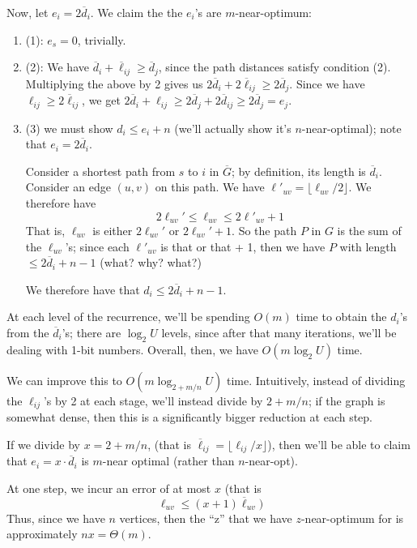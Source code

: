 \documentclass{article}
\begin{document}
Now, let $e_i = 2\overline d_i$.
We claim the the $e_i$'s are $m$-near-optimum:
\begin{enumerate}
	\item
	(1): $e_s= 0$, trivially.
	\item
	(2): We have $\overline d_i + \overline \ell_{ij} \geq \overline d_j$,
	since the path distances satisfy condition (2).
	Multiplying the above by 2 gives us
	$2 \overline d_i + 2 \overline \ell_{ij} \geq 2 \overline d_j$.
	Since we have $\ell_{ij} \geq 2 \overline \ell_{ij}$,
	we get
	$2 \overline d_i +  \ell_{ij} \geq 2 \overline d_j + 2 \overline d_{ij}
	\geq 2 \overline d_j = e_j$.
	
	\item
	(3) we must show $d_i \leq e_i + n$ (we'll actually show it's 
	$n$-near-optimal); note that $e_i = 2\overline d_i$.

	Consider a shortest path from $s$ to $i$ in $\overline G$; by definition,
	its length is $\overline d_i$.
	Consider an edge $(u,v)$ on this path. We have
	$\ell'_{uv} = \lfloor \ell_{uv} / 2 \rfloor$.
	We therefore have
	$$
	2\ell_{uv}' \leq
	\ell_{uv} \leq 2\ell'_{uv} + 1
	$$
	That is, $\ell_{uv}$ is either $2\ell_{uv}'$ or $2\ell_{uv}' + 1$.
	So the path $P$ in $G$ is the sum of the $\ell_{uv}$'s; since
	each $\ell'_{uv}$ is that or that + 1, then we have $P$ with length
	$\leq 2\overline d_i + n - 1$ (what? why? what?)
	
	We therefore have that $d_i \leq 2\overline d_i + n - 1$.
\end{enumerate}
At each level of the recurrence, we'll be spending $O(m)$ time to obtain
the $d_i$'s from the $\overline d_i$'s; there are $\log_2 U$ levels, since
after that many iterations, we'll be dealing with 1-bit numbers. Overall,
then, we have $O(m\log_2 U)$ time.


We can improve this to $O(m \log_{2 + m/n} U)$ time.
Intuitively, instead of dividing the $\ell_{ij}$'s by 2 at each
stage, we'll instead divide by $2 + m/n$; if the graph is somewhat
dense, then this is a significantly bigger reduction at each step.

If we divide by $x = 2 + m/n$, (that is $\overline \ell_{ij} = \lfloor
\ell_{ij} / x\rfloor$), then we'll be able to claim that
$e_i = x\cdot \overline d_i$ is $m$-near optimal (rather than $n$-near-opt).

At one step, we incur an error of at most $x$ (that is 
$$
\ell_{uv} \leq (x + 1) \overline \ell_{uv})
$$
Thus, since we have $n$ vertices, then the ``z'' that we have $z$-near-optimum 
for is approximately
$nx = \Theta(m)$.
\end{document}
